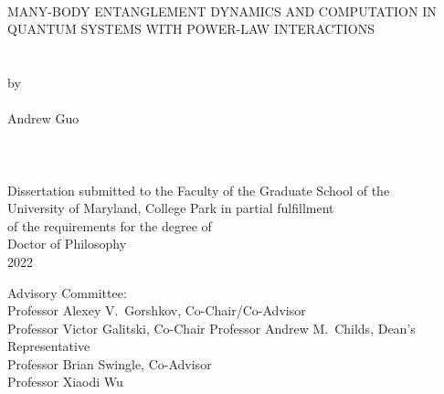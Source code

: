 \hbox{\ }
\vspace{1in}
\begin{center}

\large{{MANY-BODY ENTANGLEMENT DYNAMICS AND COMPUTATION IN QUANTUM SYSTEMS WITH POWER-LAW INTERACTIONS}}\\
\ \\
\ \\
\large{by} \\
\ \\
\large{Andrew Guo}%
\ \\
\ \\
\ \\
\ \\
\normalsize
Dissertation submitted to the Faculty of the Graduate School of the \\
University of Maryland, College Park in partial fulfillment \\
of the requirements for the degree of \\
Doctor of Philosophy \\
2022
\end{center}

\vspace{7.5em}

\noindent Advisory Committee: \\
Professor Alexey V.\ Gorshkov, Co-Chair/Co-Advisor \\
Professor Victor Galitski, Co-Chair
Professor Andrew M.\ Childs, Dean's Representative \\
Professor Brian Swingle, Co-Advisor\\
Professor Xiaodi Wu
